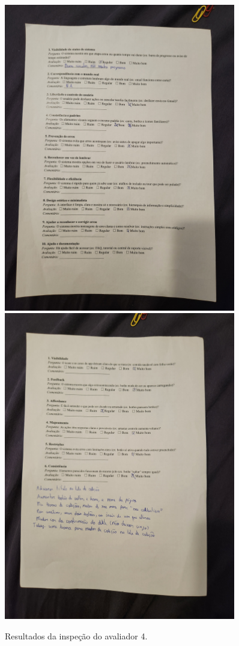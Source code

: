 \begin{figure}[H]
    \centering
    \includegraphics[width=0.9\textwidth]{sections/appendix/resultados_inspecao_usabilidade/4 (1).jpg}
    \includegraphics[width=0.9\textwidth]{sections/appendix/resultados_inspecao_usabilidade/4 (2).jpg}
    \caption{Resultados da inspeção do avaliador 4.}
\end{figure}


